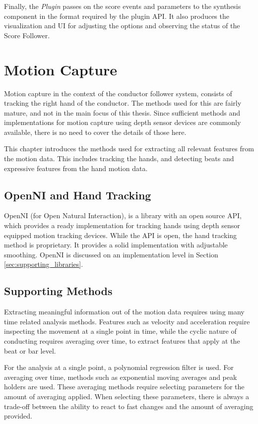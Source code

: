 Finally, the \textit{Plugin}
passes on the score events and parameters
to the synthesis component in the format required
by the plugin API.
It also produces the visualization and UI
for adjusting the options
and observing the status of the Score Follower.

\chapter{Motion Capture}
\label{chapter:motion_capture}

Motion capture in the context of the conductor follower system,
consists of tracking the right hand of the conductor.
The methods used for this are fairly mature,
and not in the main focus of this thesis.
Since sufficient methods and implementations for
motion capture using depth sensor devices
are commonly available,
there is no need to cover the details of those here.

This chapter introduces the methods used for
extracting all relevant features from the motion data.
This includes tracking the hands,
and detecting beats and expressive features
from the hand motion data.

\section{OpenNI and Hand Tracking}

OpenNI (for Open Natural Interaction),
is a library with an open source API,
which provides
a ready implementation for tracking hands
using depth sensor equipped motion tracking devices.
While the API is open, 
the hand tracking method is proprietary.
It provides a solid implementation
with adjustable smoothing.
OpenNI is discussed on an implementation level in Section
\ref{sec:supporting_libraries}.

\section{Supporting Methods}

Extracting meaningful information out of the motion data
requires using many time related analysis methods.
Features such as velocity and acceleration
require inspecting the movement at a single point in time,
while the cyclic nature of conducting requires
averaging over time, to extract features that apply
at the beat or bar level.

For the analysis at a single point,
a polynomial regression filter is used.
For averaging over time, methods such as
exponential moving averages and peak holders are used.
These averaging methods require selecting 
parameters for the amount of averaging applied.
When selecting these parameters,
there is always a trade-off between the 
ability to react to fast changes
and the amount of averaging provided.

